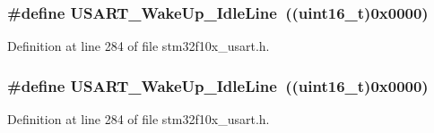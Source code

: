 \subsubsection[{\texorpdfstring{U\+S\+A\+R\+T\+\_\+\+Wake\+Up\+\_\+\+Idle\+Line}{USART_WakeUp_IdleLine}}]{\setlength{\rightskip}{0pt plus 5cm}\#define U\+S\+A\+R\+T\+\_\+\+Wake\+Up\+\_\+\+Idle\+Line~(({\bf uint16\+\_\+t})0x0000)}\hypertarget{group___u_s_a_r_t___wake_up__methods_ga9646d71590d5cef29ee12da0bb431d92}{}\label{group___u_s_a_r_t___wake_up__methods_ga9646d71590d5cef29ee12da0bb431d92}


Definition at line 284 of file stm32f10x\+\_\+usart.\+h.

\subsubsection[{\texorpdfstring{U\+S\+A\+R\+T\+\_\+\+Wake\+Up\+\_\+\+Idle\+Line}{USART_WakeUp_IdleLine}}]{\setlength{\rightskip}{0pt plus 5cm}\#define U\+S\+A\+R\+T\+\_\+\+Wake\+Up\+\_\+\+Idle\+Line~(({\bf uint16\+\_\+t})0x0000)}\hypertarget{group___u_s_a_r_t___wake_up__methods_ga9646d71590d5cef29ee12da0bb431d92}{}\label{group___u_s_a_r_t___wake_up__methods_ga9646d71590d5cef29ee12da0bb431d92}


Definition at line 284 of file stm32f10x\+\_\+usart.\+h.

